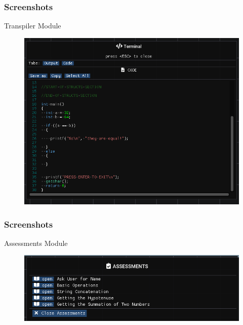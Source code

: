 \documentclass{beamer}
\begin{document}
\begin{frame}
	\frametitle{Screenshots}
	\begin{block}{Transpiler Module}
		\begin{figure}
				\includegraphics[width=1\textwidth]{../tex/media/sc_transpiled_code.png}
		\end{figure}
	\end{block}
\end{frame}

\begin{frame}
	\frametitle{Screenshots}
	\begin{block}{Assessments Module}
		\begin{figure}
				\includegraphics[width=1\textwidth]{../tex/media/sc_assessments.png}
		\end{figure}
	\end{block}
\end{frame}
\end{document}
